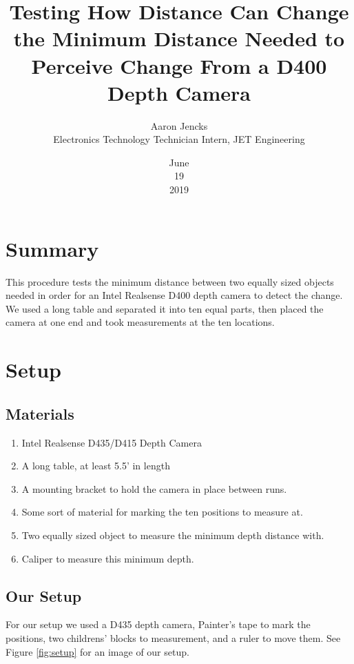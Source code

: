 \documentclass{article}
\title{Testing How Distance Can Change the Minimum Distance Needed to Perceive Change From a D400 Depth Camera}
\date{June\\19\\2019}
\author{Aaron Jencks\\Electronics Technology Technician Intern, JET Engineering}
\begin{document}
	\maketitle
	\newpage
	
	\tableofcontents
	\newpage
	
	\section{Summary}
		This procedure tests the minimum distance between two equally sized objects needed in order for an Intel Realsense D400 depth camera to detect the change.  We used a long table and separated it into ten equal parts, then placed the camera at one end and took measurements at the ten locations.
	
	\section{Setup}
		\subsection{Materials}
			\begin{enumerate}
				\item Intel Realsense D435/D415 Depth Camera
				\item A long table, at least 5.5' in length
				\item A mounting bracket to hold the camera in place between runs.
				\item Some sort of material for marking the ten positions to measure at.
				\item Two equally sized object to measure the minimum depth distance with.
				\item Caliper to measure this minimum depth.
			\end{enumerate}
		\subsection{Our Setup}
			For our setup we used a D435 depth camera, Painter's tape to mark the positions, two childrens' blocks to measurement, and a ruler to move them. See Figure \ref{fig:setup} for an image of our setup.
			
\end{document}
